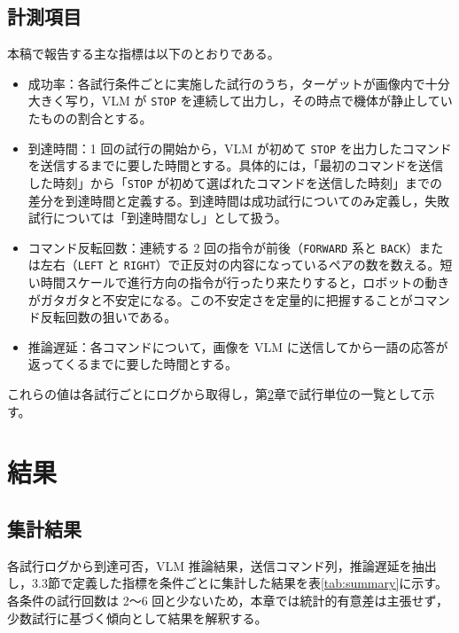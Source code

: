 \documentclass[a4paper,11pt]{ltjsreport}
\begin{document}
\section{計測項目}
本稿で報告する主な指標は以下のとおりである。
\begin{itemize}
  \item 成功率：各試行条件ごとに実施した試行のうち，ターゲットが画像内で十分大きく写り，VLM が \texttt{STOP} を連続して出力し，その時点で機体が静止していたものの割合とする。

  \item 到達時間：1 回の試行の開始から，VLM が初めて \texttt{STOP} を出力したコマンドを送信するまでに要した時間とする。具体的には，「最初のコマンドを送信した時刻」から「\texttt{STOP} が初めて選ばれたコマンドを送信した時刻」までの差分を到達時間と定義する。到達時間は成功試行についてのみ定義し，失敗試行については「到達時間なし」として扱う。

  \item コマンド反転回数：連続する 2 回の指令が前後（\texttt{FORWARD} 系と \texttt{BACK}）または左右（\texttt{LEFT} と \texttt{RIGHT}）で正反対の内容になっているペアの数を数える。短い時間スケールで進行方向の指令が行ったり来たりすると，ロボットの動きがガタガタと不安定になる。この不安定さを定量的に把握することがコマンド反転回数の狙いである。

  \item 推論遅延：各コマンドについて，画像を VLM に送信してから一語の応答が返ってくるまでに要した時間とする。
\end{itemize}
これらの値は各試行ごとにログから取得し，第\ref{chap:results}章で試行単位の一覧として示す。

\chapter{結果}
\label{chap:results}
\section{集計結果}
各試行ログから到達可否，VLM 推論結果，送信コマンド列，推論遅延を抽出し，3.3節で定義した指標を条件ごとに集計した結果を表\ref{tab:summary}に示す。各条件の試行回数は 2〜6 回と少ないため，本章では統計的有意差は主張せず，少数試行に基づく傾向として結果を解釈する。
\end{document}
